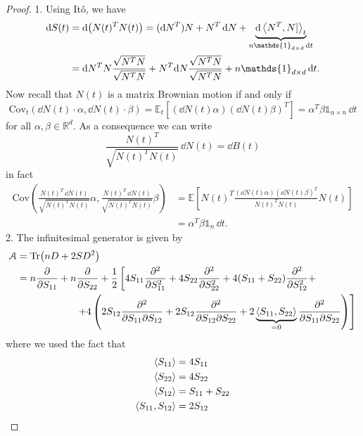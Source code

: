 \begin{proof} %
    1. Using Itô, we have
    \begin{align*}
        \dd S(t) &= \dd(N(t)^TN(t)) = (\dd N^T)N + N^T\,\dd N + \underbrace{\dd\expval{N^T,N]}_t}_{n\mathds{1}_{d\times d}\,\dd t} \\
        &=
        \dd N^TN\frac{\sqrt{N^TN}}{\sqrt{N^TN}} + N^T\dd N \frac{\sqrt{N^TN}}{\sqrt{N^TN}} + n\mathds{1}_{d\times d}\,\dd t.
    \end{align*}
    Now recall that $N(t)$ is a matrix Brownian motion if and only if
    \begin{equation*}
        \text{Cov}_t(\dd N(t)\cdot\alpha, \dd N(t)\cdot\beta) = \mathbb{E}_t[(\dd N(t)\alpha)(\dd N(t)\beta)^T] = \alpha^T\beta\mathds{1}_{n\times n}\,\dd t
    \end{equation*}
    for all $\alpha,\beta\in\mathbb{R}^d$. As a consequence we can write
    \begin{equation*}
        \frac{N(t)^T}{\sqrt{N(t)^TN(t)}}\,\dd N(t) = \dd B(t)
    \end{equation*}
    in fact
    \begin{align*}
        \text{Cov}\left(\frac{N(t)^T\,\dd N(t)}{\sqrt{N(t)^TN(t)}}\alpha, \frac{N(t)^T\,\dd N(t)}{\sqrt{N(t)^TN(t)}}\beta\right) &= \mathbb{E}\left[N(t)^T\frac{(\dd N(t)\alpha)(\dd N(t)\beta)^T}{N(t)^TN(t)}N(t)\right] \\
        &=
        \alpha^T\beta\mathds{1}_n\,\dd t.
    \end{align*}
    2. The infinitesimal generator is given by
    \begin{align*}
        \mathcal{A} &= \Tr(nD+2SD^2) \\
        &=
        n\pdv{}{S_{11}} + n\pdv{}{S_{22}} + \frac{1}{2}\left[4S_{11}\pdv[2]{}{S_{11}} + 4S_{22}\pdv[2]{}{S_{22}} + 4(S_{11}+S_{22})\pdv[2]{}{S_{12}} + \right.\\
        &\qquad\qquad\qquad
        \left. + 4\left(2S_{12}\pdv{}{S_{11}}{S_{12}} + 2S_{12}\pdv{}{S_{12}}{S_{22}} + 2\underbrace{\expval{S_{11},S_{22}}}_{=0}\pdv{}{S_{11}}{S_{22}}\right)\right]
    \end{align*}
    where we used the fact that
    \begin{align*}
        \expval{S_{11}} &= 4S_{11} \\
        \expval{S_{22}} &= 4S_{22} \\
        \expval{S_{12}} &= S_{11} + S_{22} \\
        \expval{S_{11},S_{12}} &= 2S_{12} \\

\end{align*}
\end{proof}
